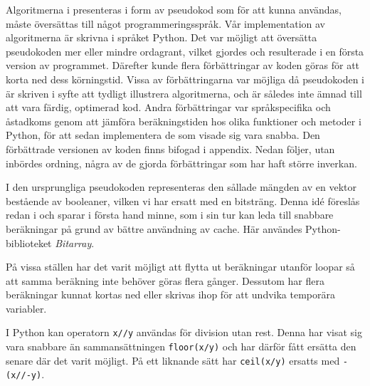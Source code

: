 
Algoritmerna i \cite{HaraldSieve} presenteras i form av pseudokod som för att kunna användas, måste översättas till något programmeringsspråk.
Vår implementation av algoritmerna är skrivna i språket Python.
Det var möjligt att översätta pseudokoden mer eller mindre ordagrant, vilket gjordes och resulterade i en första version av programmet.
Därefter kunde flera förbättringar av koden göras för att korta ned dess körningstid. 
Vissa av förbättringarna var möjliga då pseudokoden i \cite{HaraldSieve} är skriven i syfte att tydligt illustrera algoritmerna,
och är således inte ämnad till att vara färdig, optimerad kod.
Andra förbättringar var språkspecifika och åstadkoms genom att jämföra beräkningstiden hos olika funktioner och metoder i Python, för att sedan implementera de som visade sig vara snabba.
Den förbättrade versionen av koden finns bifogad i appendix.
Nedan följer, utan inbördes ordning, några av de gjorda förbättringar som har haft större inverkan.
\begin{myitemize}
    \item
    I den ursprungliga pseudokoden representeras den sållade mängden av en vektor bestående av booleaner, vilken vi har ersatt med en bitsträng.
    Denna idé föreslås redan i \cite{HaraldSieve} och sparar i första hand minne,
    som i sin tur kan leda till snabbare beräkningar på grund av bättre användning av cache.
    Här användes Python-biblioteket \textit{Bitarray}.
    \item
    På vissa ställen har det varit möjligt att flytta ut beräkningar utanför loopar så att samma beräkning inte behöver göras flera gånger. 
    Dessutom har flera beräkningar kunnat kortas ned eller skrivas ihop för att undvika temporära variabler.
    \item
    I Python kan operatorn \texttt{x//y} användas för division utan rest. Denna har visat sig vara snabbare än sammansättningen \texttt{floor(x/y)} och har därför fått ersätta den senare där det varit möjligt. På ett liknande sätt har \texttt{ceil(x/y)} ersatts med \texttt{-(x//-y)}.
\end{myitemize}


